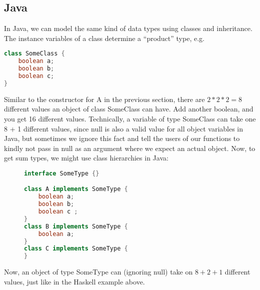             \subsection*{Java}
            In Java, we can model the same kind of data types using classes and inheritance. The instance
            variables of a class determine a “product” type, e.g.

            \begin{lstlisting}[language=Java]
class SomeClass {
    boolean a;
    boolean b;
    boolean c;
}
            \end{lstlisting}
    Similar to the constructor for A in the previous section, there are $2 * 2 * 2 = 8$ different
    values an object of class SomeClass can have. Add another boolean, and you get 16 different
    values. Technically, a variable of type SomeClass can take one 8 + 1 different values, since
    null is also a valid value for all object variables in Java, but sometimes we ignore this fact
    and tell the users of our functions to kindly not pass in null as an argument where we expect
    an actual object.
    Now, to get sum types, we might use class hierarchies in Java:

    \begin{figure}[!h]
        \centering
        \begin{lstlisting}[language=Java]
interface SomeType {}

class A implements SomeType {
    boolean a;
    boolean b;
    boolean c ;
}
class B implements SomeType {
    boolean a;
}
class C implements SomeType {
}
        \end{lstlisting}
    \end{figure}

    Now, an object of type SomeType can (ignoring null) take on $8 + 2 + 1$ different values,
    just like in the Haskell example above.
